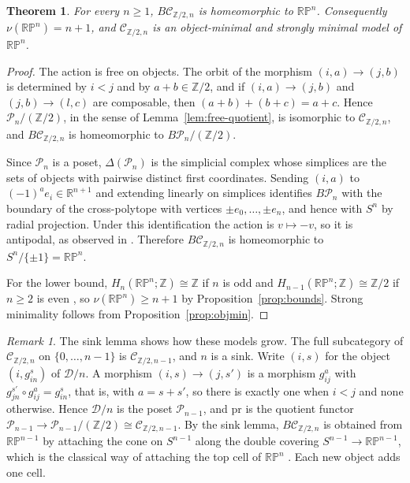 \documentclass[12pt]{amsart}
\newtheorem{theorem}[teo]{Theorem}
\theoremstyle{definition}
\theoremstyle{remark}
\newtheorem{remark}[teo]{Remark}
\newcommand{\CC}{\mathcal{C}}
\newcommand{\DD}{\mathcal{D}}
\newcommand{\PP}{\mathcal{P}}
\newcommand{\Z}{\mathbb{Z}}
\newcommand{\RP}{\mathbb{RP}}
\newcommand{\nerve}{\Delta}
\begin{document}
\begin{theorem}\label{thm:RPn}
For every $n\ge1$, $B\CC_{\Z/2,n}$ is homeomorphic to $\RP^n$. Consequently $\nu(\RP^n)=n+1$, and $\CC_{\Z/2,n}$ is an object-minimal and strongly minimal model of $\RP^n$.
\end{theorem}

\begin{proof}
The action is free on objects. The orbit of the morphism $(i,a)\to(j,b)$ is determined by $i<j$ and by $a+b\in\Z/2$, and if $(i,a)\to(j,b)$ and $(j,b)\to(l,c)$ are composable, then $(a+b)+(b+c)=a+c$. Hence $\PP_n/(\Z/2)$, in the sense of Lemma~\ref{lem:free-quotient}, is isomorphic to $\CC_{\Z/2,n}$, and $B\CC_{\Z/2,n}$ is homeomorphic to $B\PP_n/(\Z/2)$.

Since $\PP_n$ is a poset, $\nerve(\PP_n)$ is the simplicial complex whose simplices are the sets of objects with pairwise distinct first coordinates. Sending $(i,a)$ to $(-1)^ae_i\in\mathbb R^{n+1}$ and extending linearly on simplices identifies $B\PP_n$ with the boundary of the cross-polytope with vertices $\pm e_0,\dots,\pm e_n$, and hence with $S^n$ by radial projection. Under this identification the action is $v\mapsto-v$, so it is antipodal, as observed in \cite[Example~14.6]{Kozlov2008}. Therefore $B\CC_{\Z/2,n}$ is homeomorphic to $S^n/\{\pm1\}=\RP^n$.

For the lower bound, $H_n(\RP^n;\Z)\cong\Z$ if $n$ is odd and $H_{n-1}(\RP^n;\Z)\cong\Z/2$ if $n\ge2$ is even \cite{Hatcher2002}, so $\nu(\RP^n)\ge n+1$ by Proposition~\ref{prop:bounds}. Strong minimality follows from Proposition~\ref{prop:objmin}.
\end{proof}

\begin{remark}\label{rem:RP-cells}
The sink lemma shows how these models grow. The full subcategory of $\CC_{\Z/2,n}$ on $\{0,\dots,n-1\}$ is $\CC_{\Z/2,n-1}$, and $n$ is a sink. Write $(i,s)$ for the object $(i,g_{in}^s)$ of $\DD/n$. A morphism $(i,s)\to(j,s')$ is a morphism $g_{ij}^a$ with $g_{jn}^{s'}\circ g_{ij}^a=g_{in}^s$, that is, with $a=s+s'$, so there is exactly one when $i<j$ and none otherwise. Hence $\DD/n$ is the poset $\PP_{n-1}$, and $\mathrm{pr}$ is the quotient functor $\PP_{n-1}\to\PP_{n-1}/(\Z/2)\cong\CC_{\Z/2,n-1}$. By the sink lemma, $B\CC_{\Z/2,n}$ is obtained from $\RP^{n-1}$ by attaching the cone on $S^{n-1}$ along the double covering $S^{n-1}\to\RP^{n-1}$, which is the classical way of attaching the top cell of $\RP^n$ \cite[Example~0.4]{Hatcher2002}. Each new object adds one cell.
\end{remark}
\end{document}
